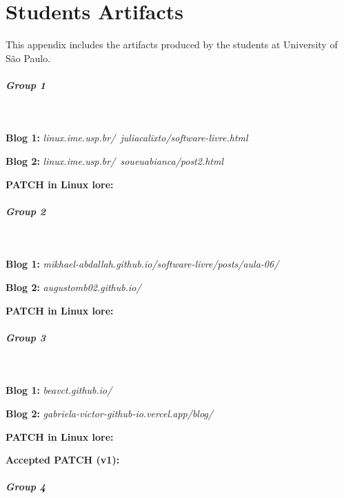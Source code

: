 \chapter{Students Artifacts}

\label{app:stuart}

This appendix includes the artifacts produced by the students at University of São Paulo.

\paragraph{Group 1}

\

\textbf{Blog 1:} \textit{linux.ime.usp.br/~juliacalixto/software-livre.html}

\textbf{Blog 2:} \textit{linux.ime.usp.br/~soueuabianca/post2.html}

\textbf{PATCH in Linux lore:} \textit{}

\paragraph{Group 2}

\

\textbf{Blog 1:} \textit{mikhael-abdallah.github.io/software-livre/posts/aula-06/}

\textbf{Blog 2:} \textit{augustomb02.github.io/}

\textbf{PATCH in Linux lore:} \textit{}

\paragraph{Group 3}

\

\textbf{Blog 1:} \textit{beavct.github.io/}

\textbf{Blog 2:} \textit{gabriela-victor-github-io.vercel.app/blog/}

\textbf{PATCH in Linux lore:} \textit{}

\textbf{Accepted PATCH (v1):} \textit{}

\paragraph{Group 4}


